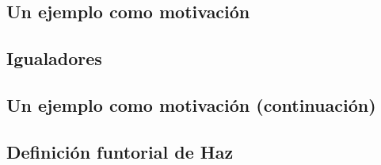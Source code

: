 \subsection{Un ejemplo como motivación}\label{subsection:EjemploMotivacion}
   
\subsection{Igualadores}
   
\subsection{Un ejemplo como motivación (continuación)}
   
\subsection{Definición funtorial de Haz}
   
